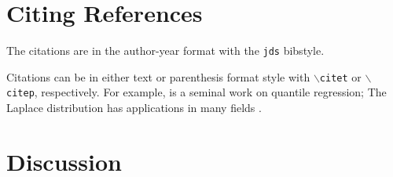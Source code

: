\documentclass[letterpaper,inpress]{jdsart}
\begin{document}
\lipsum[4-7]

\hypertarget{citing-references}{%
\section{Citing References}\label{citing-references}}

The citations are in the author-year format with the
\texttt{jds} bibstyle.

Citations can be in either text or parenthesis format style with
\texttt{$\backslash$citet} or \texttt{$\backslash$citep},
respectively. For example, \citet{KoenkerBassett1978} is a seminal
work on quantile regression; The Laplace distribution has applications
in many fields \citep{Kotz2001}.

\hypertarget{discussion}{%
\section{Discussion}\label{discussion}}

\lipsum[1-3]



\end{document}
